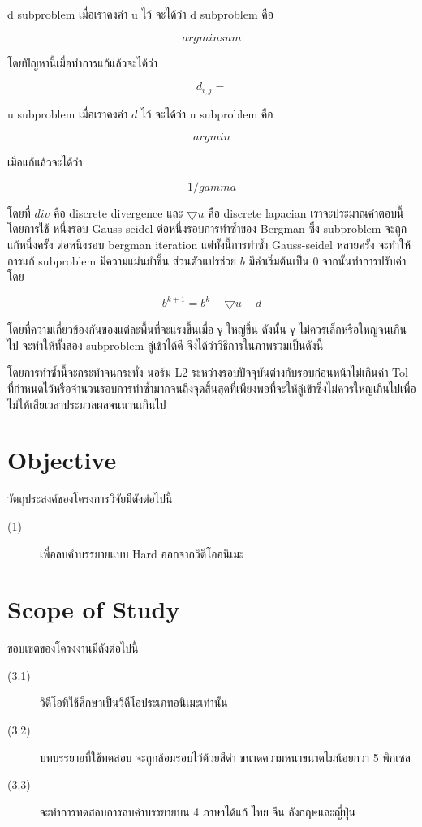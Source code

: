 \documentclass[hidelinks,a4paper,14pt]{article}
\numberwithin{equation}{section}							%
\begin{document}
{	d subproblem เมื่อเราคงค่า u ไว้ จะได้ว่า d subproblem คือ
	
	$$ arg min sum $$
	
	โดยปัญหานี้เมื่อทำการแก้แล้วจะได้ว่า 
	
	$$ d_{i,j} = $$
	
	u subproblem เมื่อเราคงค่า $d$ ไว้ จะได้ว่า u subproblem คือ
	
	$$ arg min $$
	
	เมื่อแก้แล้วจะได้ว่า
	
	$$ 1 / gamma$$
	
	โดยที่ $div$ คือ discrete divergence และ $\bigtriangledown u$ คือ discrete lapacian เราจะประมาณคำตอบนี้โดยการใช้ หนึ่งรอบ Gauss-seidel ต่อหนึ่งรอบการทำซ้ำของ Bergman ซึ่ง subproblem จะถูกแก้หนึ่งครั้ง ต่อหนึ่งรอบ bergman iteration แต่ทั้งนี้การทำซ้ำ Gauss-seidel หลายครั้ง จะทำให้การแก้ subproblem มีความแม่นยำขึ้น
	ส่วนตัวแปรช่วย $b$ มีค่าเริ่มต้นเป็น 0 จากนั้นทำการปรับค่าโดย
	
	$$ b^{k+1} = b^k  + \bigtriangledown u - d $$
	
	โดยที่ความเกี่ยวข้องกันของแต่ละพื้นที่จะแรงขึ้นเมื่อ γ ใหญ่ขึ้น ดังนั้น γ ไม่ควรเล็กหรือใหญ่จนเกินไป จะทำให้ทั้งสอง subproblem ลู่เข้าได้ดี
	จึงได้ว่าวิธีการในภาพรวมเป็นดังนี้
	
	
	โดยการทำซ้ำนี้จะกระทำจนกระทั่ง นอร์ม L2 ระหว่างรอบปัจจุบันต่างกับรอบก่อนหน้าไม่เกินค่า Tol ที่กำหนดไว้หรือจำนวนรอบการทำซ้ำมากจนถึงจุดสิ้นสุดที่เพียงพอที่จะให้ลู่เข้าซึ่งไม่ควรใหญ่เกินไปเพื่อไม่ให้เสียเวลาประมวลผลจนนานเกินไป
	
	

\section{Objective}
วัตถุประสงค์ของโครงการวิจัยมีดังต่อไปนี้
\begin{description}
	\item[(1)] เพื่อลบคำบรรยายแบบ Hard ออกจากวิดีโออนิเมะ
\end{description}

\section{Scope of Study}
ขอบเขตของโครงงานมีดังต่อไปนี้
\begin{description}
\item[(3.1)] วิดีโอที่ใช้ศึกษาเป็นวิดีโอประเภทอนิเมะเท่านั้น
\item[(3.2)] บทบรรยายที่ใช้ทดสอบ จะถูกล้อมรอบไว้ด้วยสีดำ ขนาดความหนาขนาดไม่น้อยกว่า 5 พิกเซล
\item[(3.3)] จะทำการทดสอบการลบคำบรรยายบน 4 ภาษาได้แก้ ไทย จีน อังกฤษและญี่ปุ่น
\end{description}

}
\end{document}

